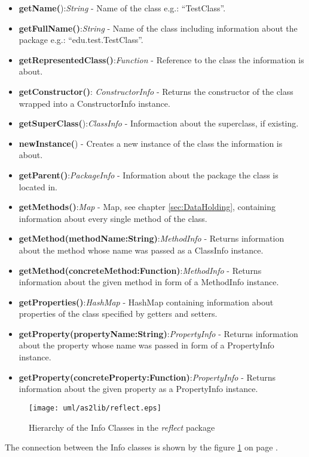 \begin{itemize}
	\item \textbf{getName(}):\textit{String} - Name of the class e.g.: "`TestClass"'.
	\item \textbf{getFullName()}:\textit{String} - Name of the class including information about the package e.g.: "`edu.test.TestClass"'.
	\item \textbf{getRepresentedClass()}:\textit{Function} - Reference to the class the information is about.
	\item \textbf{getConstructor()}: \textit{ConstructorInfo} - Returns the constructor of the class wrapped into a ConstructorInfo instance.
	\item \textbf{getSuperClass(}):\textit{ClassInfo} - Informaction about the superclass, if existing.
	\item \textbf{newInstance(}) - Creates a new instance of the class the information is about.
	\item \textbf{getParent()}:\textit{PackageInfo} - Information about the package the class is located in.
	\item \textbf{getMethods()}:\textit{Map} - Map, see chapter \ref{sec:DataHolding}, containing information about every single method of the class.
	\item \textbf{getMethod(methodName:String)}:\textit{MethodInfo} - Returns information about the method whose name was passed as a ClassInfo instance.
	\item \textbf{getMethod(concreteMethod:Function)}:\textit{MethodInfo} - Returns information about the given method in form of a MethodInfo instance.
	\item \textbf{getProperties()}:\textit{HashMap} - HashMap containing information about properties of the class specified by getters and setters.
	\item \textbf{getProperty(propertyName:String)}:\textit{PropertyInfo} - Returns information about the property whose name was passed in form of a PropertyInfo instance. 
	\item \textbf{getProperty(concreteProperty:Function)}:\textit{PropertyInfo} - Returns information about the given property as a PropertyInfo instance.
\end{itemize}

\begin{figure}
\begin{center}
\texttt{[image: uml/as2lib/reflect.eps]}
\caption{Hierarchy of the Info Classes in the \emph{reflect} package}
\label{fig:as2libreflect}
\end{center}
\end{figure}
The connection between the Info classes is shown by the figure \ref{fig:as2libreflect} on page \pageref{fig:as2libreflect}.
